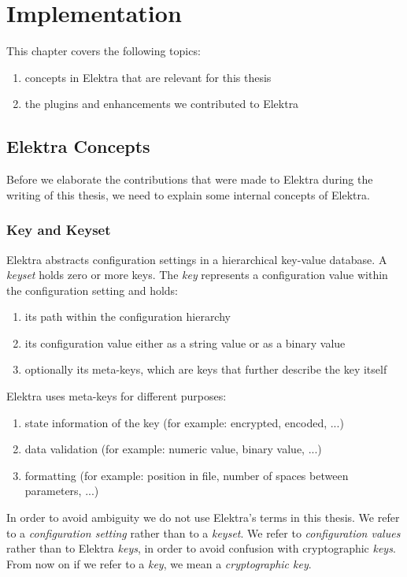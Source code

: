 \chapter{Implementation}

This chapter covers the following topics:
\begin{enumerate}
\item concepts in Elektra that are relevant for this thesis
\item the plugins and enhancements we contributed to Elektra
\end{enumerate}


\section{Elektra Concepts}\label{elektra-plugins}

Before we elaborate the contributions that were made to Elektra during the writing of this thesis, we need to explain some internal concepts of Elektra.

\subsection{Key and Keyset}

Elektra abstracts configuration settings in a hierarchical key-value database.
A \emph{keyset} holds zero or more keys.
The \emph{key} represents a configuration value within the configuration setting and holds:
\begin{enumerate}
\item its path within the configuration hierarchy
\item its configuration value either as a string value or as a binary value
\item optionally its meta-keys, which are keys that further describe the key itself
\end{enumerate}

Elektra uses meta-keys for different purposes:

\begin{enumerate}
\item state information of the key (for example: encrypted, encoded, ...)
\item data validation (for example: numeric value, binary value, ...)
\item formatting (for example: position in file, number of spaces between parameters, ...)
\end{enumerate}

In order to avoid ambiguity we do not use Elektra's terms in this thesis.
We refer to a \emph{configuration setting} rather than to a \emph{keyset}.
We refer to \emph{configuration values} rather than to Elektra \emph{keys}, in order to avoid confusion with cryptographic \emph{keys}.
From now on if we refer to a \emph{key}, we mean a \emph{cryptographic key}.

